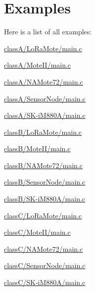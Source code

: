 \section{Examples}
Here is a list of all examples\+:\begin{DoxyCompactItemize}
\item 
\hyperlink{classA_2LoRaMote_2main_8c-example}{class\+A/\+Lo\+Ra\+Mote/main.\+c}
\item 
\hyperlink{classA_2MoteII_2main_8c-example}{class\+A/\+Mote\+I\+I/main.\+c}
\item 
\hyperlink{classA_2NAMote72_2main_8c-example}{class\+A/\+N\+A\+Mote72/main.\+c}
\item 
\hyperlink{classA_2SensorNode_2main_8c-example}{class\+A/\+Sensor\+Node/main.\+c}
\item 
\hyperlink{classA_2SK-iM880A_2main_8c-example}{class\+A/\+S\+K-\/i\+M880\+A/main.\+c}
\item 
\hyperlink{classB_2LoRaMote_2main_8c-example}{class\+B/\+Lo\+Ra\+Mote/main.\+c}
\item 
\hyperlink{classB_2MoteII_2main_8c-example}{class\+B/\+Mote\+I\+I/main.\+c}
\item 
\hyperlink{classB_2NAMote72_2main_8c-example}{class\+B/\+N\+A\+Mote72/main.\+c}
\item 
\hyperlink{classB_2SensorNode_2main_8c-example}{class\+B/\+Sensor\+Node/main.\+c}
\item 
\hyperlink{classB_2SK-iM880A_2main_8c-example}{class\+B/\+S\+K-\/i\+M880\+A/main.\+c}
\item 
\hyperlink{classC_2LoRaMote_2main_8c-example}{class\+C/\+Lo\+Ra\+Mote/main.\+c}
\item 
\hyperlink{classC_2MoteII_2main_8c-example}{class\+C/\+Mote\+I\+I/main.\+c}
\item 
\hyperlink{classC_2NAMote72_2main_8c-example}{class\+C/\+N\+A\+Mote72/main.\+c}
\item 
\hyperlink{classC_2SensorNode_2main_8c-example}{class\+C/\+Sensor\+Node/main.\+c}
\item 
\hyperlink{classC_2SK-iM880A_2main_8c-example}{class\+C/\+S\+K-\/i\+M880\+A/main.\+c}
\end{DoxyCompactItemize}
